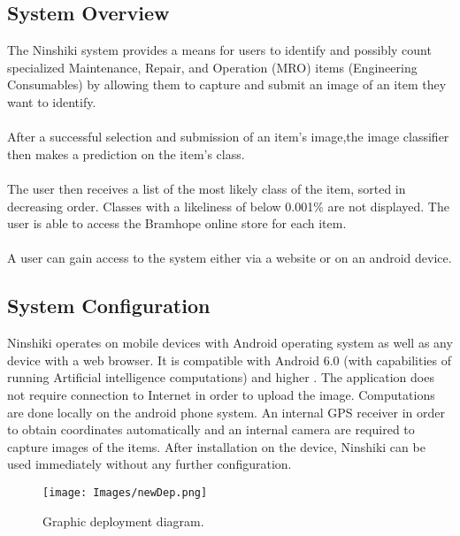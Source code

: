 \documentclass[a4paper, 12pt]{article}
\begin{document}
\subsection{System Overview}
The Ninshiki system provides a means for users to identify and possibly count specialized Maintenance, Repair, and Operation (MRO) items (Engineering Consumables) by allowing them to capture and submit an image of an item they want to identify.
\\ \\
After a successful selection and submission of an item's image,the image classifier then makes a prediction on the item's class.
\\ \\
The user then receives a list of the most likely class of the item, sorted in decreasing order. Classes with a likeliness of below 0.001\% are not displayed. The user is able to access the Bramhope online store for each item.
\\ \\
A user can gain access to the system either via a website or on an android device.

\subsection{System Configuration}
Ninshiki operates on mobile devices with Android operating system as well as any device with a web browser. It is compatible with Android 6.0 (with capabilities of running Artificial intelligence computations) and higher . The application does not require connection to Internet in order to upload the image. Computations are done locally on the android phone system. An internal GPS receiver in order to obtain coordinates automatically and an internal camera are required to capture images of the items. After installation on the device, Ninshiki can be used immediately without any further configuration. 
\pagebreak
\begin{figure}[h!]
\texttt{[image: Images/newDep.png]}
\centering
\caption{Graphic deployment diagram.}
\end{figure}
\end{document}
